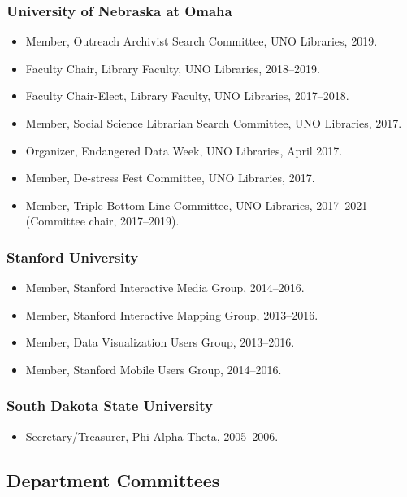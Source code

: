 \documentclass[10pt]{article}
\begin{document}
\subsubsection*{University of Nebraska at Omaha}

\begin{itemize}
  \item Member, Outreach Archivist Search Committee, UNO Libraries, 2019.
  \item Faculty Chair, Library Faculty, UNO Libraries, 2018--2019.
  \item Faculty Chair-Elect, Library Faculty, UNO Libraries, 2017--2018.
  \item Member, Social Science Librarian Search Committee, UNO Libraries, 2017.
  \item Organizer, Endangered Data Week, UNO Libraries, April 2017.
  \item Member, De-stress Fest Committee, UNO Libraries, 2017.
  \item Member, Triple Bottom Line Committee, UNO Libraries, 2017--2021 (Committee chair, 2017--2019).
\end{itemize}

\subsubsection*{Stanford University}

\begin{itemize}
  \item Member, Stanford Interactive Media Group, 2014--2016.
  \item Member, Stanford Interactive Mapping Group, 2013--2016.
  \item Member, Data Visualization Users Group, 2013--2016.
  \item Member, Stanford Mobile Users Group, 2014--2016.
\end{itemize}

\subsubsection*{South Dakota State University}

\begin{itemize}
  \item Secretary/Treasurer, Phi Alpha Theta, 2005--2006.
\end{itemize}

\subsection{Department Committees}
\end{document}
